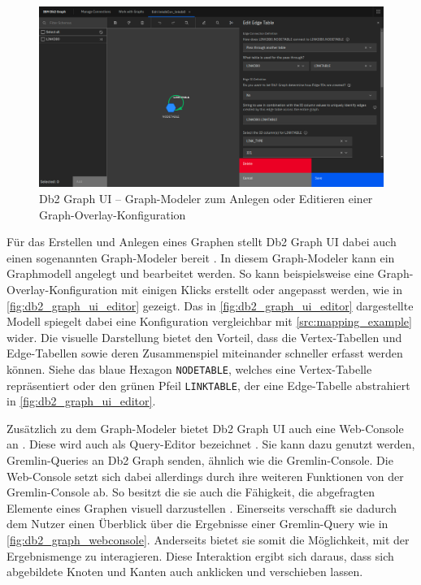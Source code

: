 \begin{figure}[ht]
    \centering
    \includegraphics[width=\textwidth]{images/db2_graph_editor.png}
    \vspace{0.1em}
    \caption[Db2 Graph UI -- Graph-Modeler]{Db2 Graph UI -- Graph-Modeler zum Anlegen oder Editieren einer Graph-Overlay-Konfiguration}
    \label{fig:db2_graph_ui_editor}
\end{figure}

Für das Erstellen und Anlegen eines Graphen stellt Db2 Graph UI dabei auch einen sogenannten Graph-Modeler bereit \cite{ibm_docs_db2_graph_ui}. In diesem Graph-Modeler kann ein Graphmodell angelegt und bearbeitet werden. So kann beispielsweise eine Graph-Overlay-Konfiguration mit einigen Klicks erstellt oder angepasst werden, wie in \autoref{fig:db2_graph_ui_editor} gezeigt. Das in \autoref{fig:db2_graph_ui_editor} dargestellte Modell spiegelt dabei eine Konfiguration vergleichbar mit \autoref{src:mapping_example} wider. Die visuelle Darstellung bietet den Vorteil, dass die Vertex-Tabellen und Edge-Tabellen sowie deren Zusammenspiel miteinander schneller erfasst werden können. Siehe das blaue Hexagon \texttt{NODETABLE}, welches eine Vertex-Tabelle repräsentiert oder den grünen Pfeil \texttt{LINKTABLE}, der eine Edge-Tabelle abstrahiert in \autoref{fig:db2_graph_ui_editor}.

Zusätzlich zu dem Graph-Modeler bietet Db2 Graph UI auch eine Web-Console an \cite{ibm_docs_db2_graph_ui}. Diese wird auch als Query-Editor bezeichnet \cite{ibm_docs_db2_graph_ui}. Sie kann dazu genutzt werden, Gremlin-Queries an Db2 Graph senden, ähnlich wie die Gremlin-Console. Die Web-Console setzt sich dabei allerdings durch ihre weiteren Funktionen von der Gremlin-Console ab. So besitzt die sie auch die Fähigkeit, die abgefragten Elemente eines Graphen visuell darzustellen \cite{ibm_docs_db2_graph_ui}. Einerseits verschafft sie dadurch dem Nutzer einen Überblick über die Ergebnisse einer Gremlin-Query wie in \autoref{fig:db2_graph_webconsole}. Anderseits bietet sie somit die Möglichkeit, mit der Ergebnismenge zu interagieren. Diese Interaktion ergibt sich daraus, dass sich abgebildete Knoten und Kanten auch anklicken und verschieben lassen.

